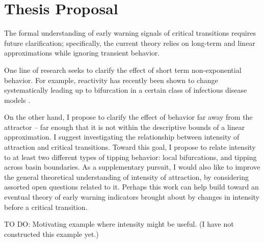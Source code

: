 \section{Thesis Proposal}
\label{sec:proposal}

The formal understanding of early warning signals of critical transitions requires future clarification; specifically, the current theory relies on long-term and linear approximations while ignoring transient behavior. 

One line of research seeks to clarify the effect of short term non-exponential behavior. For example, reactivity has recently been shown to change systematically leading up to bifurcation in a certain class of infectious disease models \cite{oreganTransientIndicatorsTipping2020}. 

On the other hand, I propose to clarify the effect of behavior far away from the attractor -- far enough that it is not within the descriptive bounds of a linear approximation. I suggest investigating the relationship between intensity of attraction and critical transitions. 
%
Toward this goal, I propose to relate intensity to at least two different types of tipping behavior: local bifurcations, and tipping across basin boundaries. As a supplementary pursuit, I would also like to improve the general theoretical understanding of intensity of attraction, by considering assorted open questions related to it. 
%
Perhaps this work can help build toward an eventual theory of early warning indicators brought about by changes in intensity before a critical transition. 



%

TO DO: Motivating example where intensity might be useful. (I have not constructed this example yet.)



